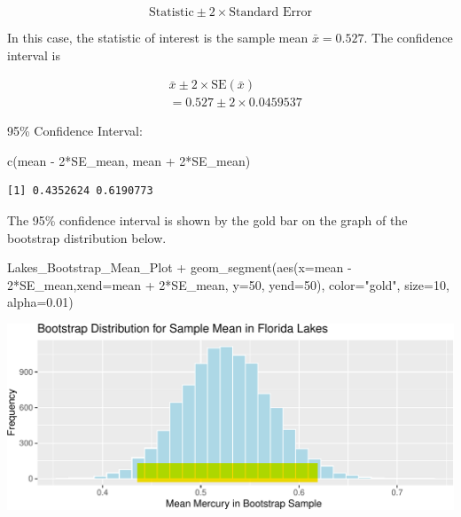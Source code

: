 \documentclass[
  letterpaper,
  DIV=11,
  numbers=noendperiod]{scrreprt}
\newenvironment{Shaded}{\begin{snugshade}}{\end{snugshade}}
\newcommand{\AttributeTok}[1]{\textcolor[rgb]{0.40,0.45,0.13}{#1}}
\newcommand{\DecValTok}[1]{\textcolor[rgb]{0.68,0.00,0.00}{#1}}
\newcommand{\FloatTok}[1]{\textcolor[rgb]{0.68,0.00,0.00}{#1}}
\newcommand{\FunctionTok}[1]{\textcolor[rgb]{0.28,0.35,0.67}{#1}}
\newcommand{\NormalTok}[1]{\textcolor[rgb]{0.00,0.23,0.31}{#1}}
\newcommand{\SpecialCharTok}[1]{\textcolor[rgb]{0.37,0.37,0.37}{#1}}
\newcommand{\StringTok}[1]{\textcolor[rgb]{0.13,0.47,0.30}{#1}}
\begin{document}
\[
\text{Statistic} \pm 2\times\text{Standard Error}
\]

In this case, the statistic of interest is the sample mean
\(\bar{x}=0.527\). The confidence interval is

\[
\begin{aligned}
& \bar{x} \pm 2\times\text{SE}(\bar{x}) \\
& = 0.527 \pm 2\times\text{0.0459537}
\end{aligned}
\]

95\% Confidence Interval:

\begin{Shaded}
\begin{Highlighting}[]
\FunctionTok{c}\NormalTok{(mean }\SpecialCharTok{{-}} \DecValTok{2}\SpecialCharTok{*}\NormalTok{SE\_mean, mean }\SpecialCharTok{+} \DecValTok{2}\SpecialCharTok{*}\NormalTok{SE\_mean) }
\end{Highlighting}
\end{Shaded}

\begin{verbatim}
[1] 0.4352624 0.6190773
\end{verbatim}

The 95\% confidence interval is shown by the gold bar on the graph of
the bootstrap distribution below.

\begin{Shaded}
\begin{Highlighting}[]
\NormalTok{Lakes\_Bootstrap\_Mean\_Plot }\SpecialCharTok{+} 
  \FunctionTok{geom\_segment}\NormalTok{(}\FunctionTok{aes}\NormalTok{(}\AttributeTok{x=}\NormalTok{mean }\SpecialCharTok{{-}} \DecValTok{2}\SpecialCharTok{*}\NormalTok{SE\_mean,}\AttributeTok{xend=}\NormalTok{mean }\SpecialCharTok{+} \DecValTok{2}\SpecialCharTok{*}\NormalTok{SE\_mean, }\AttributeTok{y=}\DecValTok{50}\NormalTok{, }\AttributeTok{yend=}\DecValTok{50}\NormalTok{), }
               \AttributeTok{color=}\StringTok{"gold"}\NormalTok{, }\AttributeTok{size=}\DecValTok{10}\NormalTok{, }\AttributeTok{alpha=}\FloatTok{0.01}\NormalTok{) }
\end{Highlighting}
\end{Shaded}

\includegraphics{Ch3_files/figure-pdf/unnamed-chunk-73-1.pdf}
\end{document}
